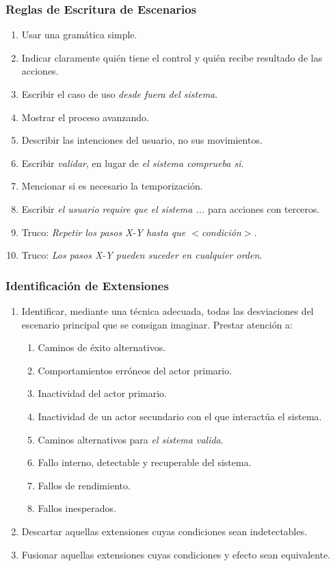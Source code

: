 \documentclass[handout,slidestop,xcolor=pst,dvips,blue]{beamer}
\begin{document}
\begin{frame}[c]
    \frametitle{Reglas de Escritura de Escenarios}
    \begin{enumerate}[<+->]
        \item Usar una gramática simple.
        \item Indicar claramente quién tiene el control y quién recibe resultado de las acciones.
        \item Escribir el caso de uso \emph{desde fuera del sistema}.
        \item Mostrar el proceso avanzando.
        \item Describir las intenciones del usuario, no sus movimientos.
        \item Escribir \emph{validar}, en lugar de \emph{el sistema comprueba si}.
        \item Mencionar si es necesario la temporización.
        \item Escribir \emph{el usuario require que el sistema ...} para acciones con terceros.
        \item Truco: \emph{Repetir los pasos X-Y hasta que $<$condición$>$}.
        \item Truco: \emph{Los pasos X-Y pueden suceder en cualquier orden}.
    \end{enumerate}
\end{frame}

\begin{frame}[c]
    \frametitle{Identificación de Extensiones}
    \begin{enumerate}[<+->]
        \item Identificar, mediante una técnica adecuada, todas las desviaciones del escenario principal que se consigan imaginar. Prestar atención a:
            \begin{enumerate}
                \item Caminos de éxito alternativos.
                \item Comportamientos erróneos del actor primario.
                \item Inactividad del actor primario.
                \item Inactividad de un actor secundario con el que interactúa el sistema.
                \item Caminos alternativos para \emph{el sistema valida}.
                \item Fallo interno, detectable y recuperable del sistema.
                \item Fallos de rendimiento.
                \item Fallos inesperados.
            \end{enumerate}
        \item Descartar aquellas extensiones cuyas condiciones sean indetectables.
        \item Fusionar aquellas extensiones cuyas condiciones y efecto sean equivalente.
    \end{enumerate}
\end{frame}
\end{document}

